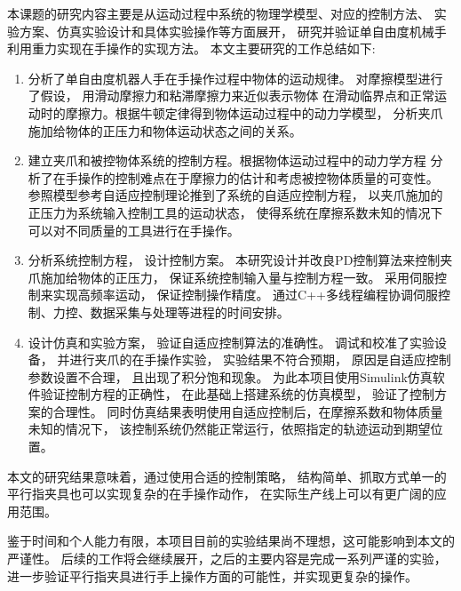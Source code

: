 \begin{conclusion}
本课题的研究内容主要是从运动过程中系统的物理学模型、对应的控制方法、
实验方案、仿真实验设计和具体实验操作等方面展开，
研究并验证单自由度机械手利用重力实现在手操作的实现方法。
本文主要研究的工作总结如下:

\begin{enumerate}[labelsep =.5em, leftmargin = 0pt, itemindent = 3em,
  itemsep=0pt, partopsep = 0pt, topsep = 5pt, itemsep = 5pt, parsep = 0pt]
  \renewcommand{\labelenumi}{(\theenumi)}
  \item 分析了单自由度机器人手在手操作过程中物体的运动规律。
    对摩擦模型进行了假设， 用滑动摩擦力和粘滞摩擦力来近似表示物体
    在滑动临界点和正常运动时的摩擦力。根据牛顿定律得到物体运动过程中的动力学模型，
    分析夹爪施加给物体的正压力和物体运动状态之间的关系。
  \item 建立夹爪和被控物体系统的控制方程。根据物体运动过程中的动力学方程
    分析了在手操作的控制难点在于摩擦力的估计和考虑被控物体质量的可变性。
    参照模型参考自适应控制理论推到了系统的自适应控制方程，
    以夹爪施加的正压力为系统输入控制工具的运动状态，
    使得系统在摩擦系数未知的情况下可以对不同质量的工具进行在手操作。
  \item 分析系统控制方程， 设计控制方案。
    本研究设计并改良PD控制算法来控制夹爪施加给物体的正压力，
    保证系统控制输入量与控制方程一致。
    采用伺服控制来实现高频率运动， 保证控制操作精度。
    通过C++多线程编程协调伺服控制、力控、数据采集与处理等进程的时间安排。
  \item 设计仿真和实验方案， 验证自适应控制算法的准确性。
    调试和校准了实验设备， 并进行夹爪的在手操作实验， 实验结果不符合预期，
    原因是自适应控制参数设置不合理， 且出现了积分饱和现象。
    为此本项目使用Simulink仿真软件验证控制方程的正确性， 在此基础上搭建系统的仿真模型，
    验证了控制方案的合理性。
    同时仿真结果表明使用自适应控制后，在摩擦系数和物体质量未知的情况下，
    该控制系统仍然能正常运行，依照指定的轨迹运动到期望位置。
\end{enumerate}

本文的研究结果意味着，通过使用合适的控制策略，
结构简单、抓取方式单一的平行指夹具也可以实现复杂的在手操作动作，
在实际生产线上可以有更广阔的应用范围。

鉴于时间和个人能力有限，本项目目前的实验结果尚不理想，这可能影响到本文的严谨性。
后续的工作将会继续展开，之后的主要内容是完成一系列严谨的实验，
进一步验证平行指夹具进行手上操作方面的可能性，并实现更复杂的操作。

\end{conclusion}


